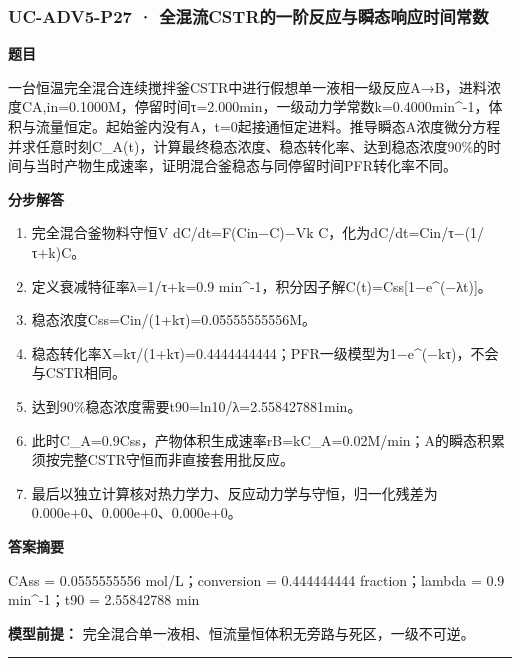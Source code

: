 \documentclass[UTF8,11pt,a4paper]{ctexart}
\begin{document}
\subsubsection*{UC-ADV5-P27 · 全混流CSTR的一阶反应与瞬态响应时间常数}
\noindent\textbf{题目}\par
一台恒温完全混合连续搅拌釜CSTR中进行假想单一液相一级反应A→B，进料浓度CA,in=0.1000M，停留时间τ=2.000min，一级动力学常数k=0.4000min\textasciicircum{}-1，体积与流量恒定。起始釜内没有A，t=0起接通恒定进料。推导瞬态A浓度微分方程并求任意时刻C\_A(t)，计算最终稳态浓度、稳态转化率、达到稳态浓度90\%的时间与当时产物生成速率，证明混合釜稳态与同停留时间PFR转化率不同。\par
\medskip\noindent\textbf{分步解答}
\begin{enumerate}
\item 完全混合釜物料守恒V dC/dt=F(Cin−C)−Vk C，化为dC/dt=Cin/τ−(1/τ+k)C。
\item 定义衰减特征率λ=1/τ+k=0.9 min\textasciicircum{}-1，积分因子解C(t)=Css[1−e\textasciicircum{}(−λt)]。
\item 稳态浓度Css=Cin/(1+kτ)=0.05555555556M。
\item 稳态转化率X=kτ/(1+kτ)=0.4444444444；PFR一级模型为1−e\textasciicircum{}(−kτ)，不会与CSTR相同。
\item 达到90\%稳态浓度需要t90=ln10/λ=2.558427881min。
\item 此时C\_A=0.9Css，产物体积生成速率rB=kC\_A=0.02M/min；A的瞬态积累须按完整CSTR守恒而非直接套用批反应。
\item 最后以独立计算核对热力学力、反应动力学与守恒，归一化残差为 0.000e+0、0.000e+0、0.000e+0。
\end{enumerate}
\noindent\textbf{答案摘要}\par
CAss = 0.0555555556 mol/L；conversion = 0.444444444 fraction；lambda = 0.9 min\textasciicircum{}-1；t90 = 2.55842788 min\par
\noindent\textbf{模型前提：}
完全混合单一液相、恒流量恒体积无旁路与死区，一级不可逆。\par
\medskip\hrule\medskip
{}
\end{document}
